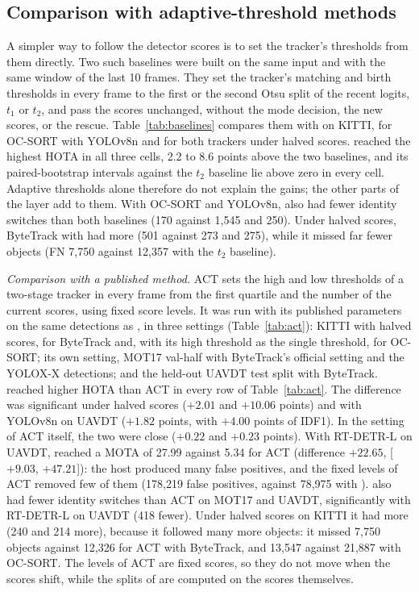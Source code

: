 \subsection{Comparison with adaptive-threshold methods}\label{sec:baselines}
A simpler way to follow the detector scores is to set the tracker's thresholds from them directly.
Two such baselines were built on the same input and with the same window of the last 10 frames.
They set the tracker's matching and birth thresholds in every frame to the first or the second Otsu
split of the recent logits, $t_1$ or $t_2$, and pass the scores unchanged, without the mode
decision, the new scores, or the rescue. Table~\ref{tab:baselines} compares them with \scl{} on
KITTI, for OC-SORT with YOLOv8n and for both trackers under halved scores. \scl{} reached the
highest HOTA in all three cells, 2.2 to 8.6 points above the two baselines, and its paired-bootstrap
intervals against the $t_2$ baseline lie above zero in every cell. Adaptive thresholds alone
therefore do not explain the gains; the other parts of the layer add to them. With OC-SORT and
YOLOv8n, \scl{} also had fewer identity switches than both baselines (170 against 1,545 and 250).
Under halved scores, ByteTrack with \scl{} had more (501 against 273 and 275), while it missed far
fewer objects (FN 7,750 against 12,357 with the $t_2$ baseline).

\emph{Comparison with a published method.} ACT \cite{act2026adaptive} sets the high and low
thresholds of a two-stage tracker in every frame from the first quartile and the number of the
current scores, using fixed score levels. It was run with its published parameters on the same
detections as \scl{}, in three settings (Table~\ref{tab:act}): KITTI with halved scores, for
ByteTrack and, with its high threshold as the single threshold, for OC-SORT; its own setting, MOT17
val-half with ByteTrack's official setting and the YOLOX-X detections; and the held-out UAVDT test
split with ByteTrack. \scl{} reached higher HOTA than ACT in every row of Table~\ref{tab:act}. The
difference was significant under halved scores ($+2.01$ and $+10.06$ points) and with YOLOv8n on
UAVDT ($+1.82$ points, with $+4.00$ points of IDF1). In the setting of ACT itself, the two were
close ($+0.22$ and $+0.23$ points). With RT-DETR-L on UAVDT, \scl{} reached a MOTA of 27.99 against
5.34 for ACT (difference $+22.65$, [$+9.03$, $+47.21$]): the host produced many false positives,
and the fixed levels of ACT removed few of them (178,219 false positives, against 78,975 with
\scl{}). \scl{} also had fewer identity switches than ACT on MOT17 and UAVDT, significantly with
RT-DETR-L on UAVDT (418 fewer). Under halved scores on KITTI it had more (240 and 214 more), because
it followed many more objects: it missed 7,750 objects against 12,326 for ACT with ByteTrack, and
13,547 against 21,887 with OC-SORT. The levels of ACT are fixed scores, so they do not move when the
scores shift, while the splits of \scl{} are computed on the scores themselves.

